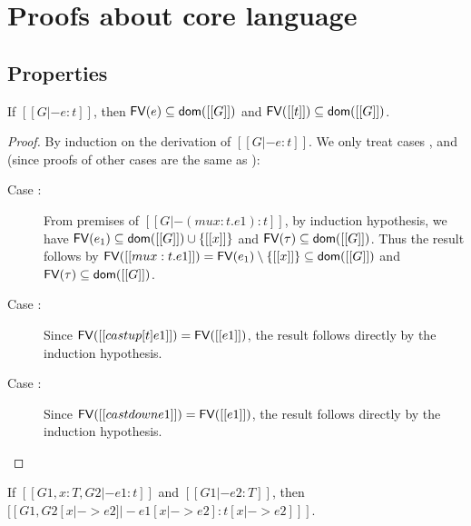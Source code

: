 \section{Proofs about core language}
\subsection{Properties}
\begin{lem}\label{lem:free}
    If $[[G |- e:t]]$, then $\mathsf{FV}(e) \subseteq \mathsf{dom}([[G]])$ and $\mathsf{FV}([[t]]) \subseteq \mathsf{dom}([[G]])$.
\end{lem}

\begin{proof}
    By induction on the derivation of $[[G |- e:t]]$. We only treat cases ,  and  (since proofs of other cases are the same as \cc \cite{handbook}):
    \begin{description}
        \item[Case :] From premises of $[[G |- (mu x:t.e1) : t]]$, by induction hypothesis, we have $\mathsf{FV}(e_1) \subseteq \mathsf{dom}([[G]]) \cup \{[[x]]\}$ and $\mathsf{FV}(\tau) \subseteq \mathsf{dom}([[G]])$. Thus the result follows by $\mathsf{FV}([[mu x:t.e1]])=\mathsf{FV}(e_1) \setminus \{[[x]]\} \subseteq \mathsf{dom}([[G]])$ and $\mathsf{FV}(\tau) \subseteq \mathsf{dom}([[G]])$.
        \item[Case :] Since $\mathsf{FV}([[castup [t] e1]])=\mathsf{FV}([[e1]])$, the result follows directly by the induction hypothesis.
        \item[Case :] Since $\mathsf{FV}([[castdown e1]])=\mathsf{FV}([[e1]])$, the result follows directly by the induction hypothesis.
    \end{description}
\end{proof}

\begin{lem}\label{lem:subst}
	If $[[G1, x:T, G2 |- e1:t]]$ and $[[G1 |- e2:T]]$, then $[[G1, G2 [x |-> e2] |- e1[x |-> e2]  : t[x |-> e2] ]]$.
\end{lem}

